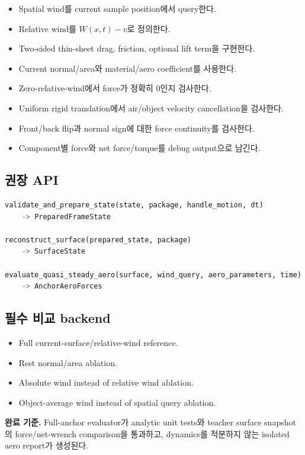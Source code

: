 \documentclass[10pt,a4paper]{article}
\newcommand{\todo}{\textcolor{TodoGray}{\(\square\)}}
\begin{document}
\begin{itemize}
  \item[\todo] Spatial wind를 current sample position에서 query한다.
  \item[\todo] Relative wind를 \(W(x,t)-v\)로 정의한다.
  \item[\todo] Two-sided thin-sheet drag, friction, optional lift term을 구현한다.
  \item[\todo] Current normal/area와 material/aero coefficient를 사용한다.
  \item[\todo] Zero-relative-wind에서 force가 정확히 0인지 검사한다.
  \item[\todo] Uniform rigid translation에서 air/object velocity cancellation을 검사한다.
  \item[\todo] Front/back flip과 normal sign에 대한 force continuity를 검사한다.
  \item[\todo] Component별 force와 net force/torque를 debug output으로 남긴다.
\end{itemize}

\subsection*{권장 API}

\begin{lstlisting}[language=Python]
validate_and_prepare_state(state, package, handle_motion, dt)
    -> PreparedFrameState

reconstruct_surface(prepared_state, package)
    -> SurfaceState

evaluate_quasi_steady_aero(surface, wind_query, aero_parameters, time)
    -> AnchorAeroForces
\end{lstlisting}

\subsection*{필수 비교 backend}

\begin{itemize}
  \item Full current-surface/relative-wind reference.
  \item Rest normal/area ablation.
  \item Absolute wind instead of relative wind ablation.
  \item Object-average wind instead of spatial query ablation.
\end{itemize}

\textbf{완료 기준.}
Full-anchor evaluator가 analytic unit tests와 teacher surface snapshot의 force/net-wrench comparison을 통과하고,
dynamics를 적분하지 않는 isolated aero report가 생성된다.
\end{document}
